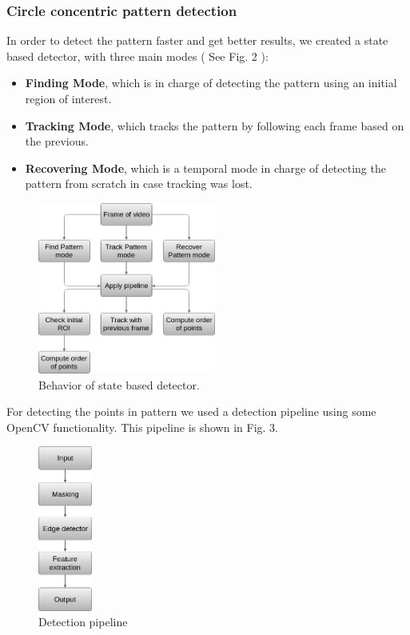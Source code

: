 \documentclass[journal]{IEEEtran}
\begin{document}
\subsubsection{ \textbf{Circle concentric pattern detection} }
In order to detect the pattern faster and get better results, we created a state based detector, with three main modes ( See Fig. 2 ):
\\
\begin{itemize}
  \item \textbf{Finding Mode}, which is in charge of detecting the pattern using an initial region of interest.
  \item \textbf{Tracking Mode}, which tracks the pattern by following each frame based on the previous.
  \item \textbf{Recovering Mode}, which is a temporal mode in charge of detecting the pattern from scratch in case tracking was lost.
\end{itemize}

\begin{figure}[H]
\centering
\includegraphics[width=2.3in]{_img/img_report4_pipeline_modes.png}
\caption{Behavior of state based detector.}
\end{figure}

For detecting the points in pattern we used a detection pipeline using some OpenCV functionality. This pipeline is shown in Fig. 3.

\begin{figure}[H]
\centering
\includegraphics[width=0.7in]{_img/img_report4_pipeline_detector.png}
\caption{Detection pipeline}
\end{figure}
\end{document}
